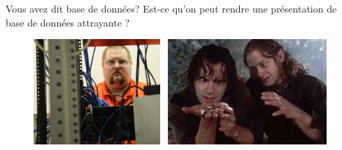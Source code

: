 \documentclass[newPxFont]{beamer}
\begin{document}
\begin{frame}[c]{Vous avez dit base de données?}
\vspace{-1cm}
Est-ce qu'on peut rendre une présentation de base de données attrayante ?
\begin{figure}
	\centering
	\includegraphics[height=4cm]{img/sexyadmin}~
  \includegraphics[height=4cm]{img/lordofthering}
\end{figure}
\end{frame}
\end{document}

